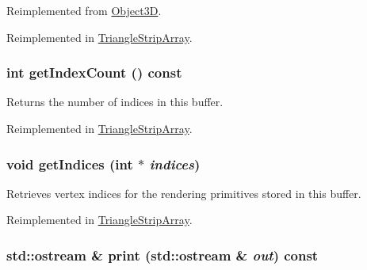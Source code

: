 Reimplemented from \hyperlink{classm3g_1_1Object3D_a25110dac934f867b83b73ad4741a0f4}{Object3D}.

Reimplemented in \hyperlink{classm3g_1_1TriangleStripArray_1623fbdfe91eb2e9d4a67bece6a46904}{TriangleStripArray}.\hypertarget{classm3g_1_1IndexBuffer_fe9ae2993ebcdb93d5ff26d57c81b73e}{
\subsubsection[{getIndexCount}]{\setlength{\rightskip}{0pt plus 5cm}int getIndexCount () const}}
\label{classm3g_1_1IndexBuffer_fe9ae2993ebcdb93d5ff26d57c81b73e}


Returns the number of indices in this buffer. 

Reimplemented in \hyperlink{classm3g_1_1TriangleStripArray_fe9ae2993ebcdb93d5ff26d57c81b73e}{TriangleStripArray}.\hypertarget{classm3g_1_1IndexBuffer_650953afac45099025a524ab160b911f}{
\subsubsection[{getIndices}]{\setlength{\rightskip}{0pt plus 5cm}void getIndices (int $\ast$ {\em indices})}}
\label{classm3g_1_1IndexBuffer_650953afac45099025a524ab160b911f}


Retrieves vertex indices for the rendering primitives stored in this buffer. 

Reimplemented in \hyperlink{classm3g_1_1TriangleStripArray_650953afac45099025a524ab160b911f}{TriangleStripArray}.\hypertarget{classm3g_1_1IndexBuffer_6fea17fa1532df3794f8cb39cb4f911f}{
\subsubsection[{print}]{\setlength{\rightskip}{0pt plus 5cm}std::ostream \& print (std::ostream \& {\em out}) const}}
\label{classm3g_1_1IndexBuffer_6fea17fa1532df3794f8cb39cb4f911f}


